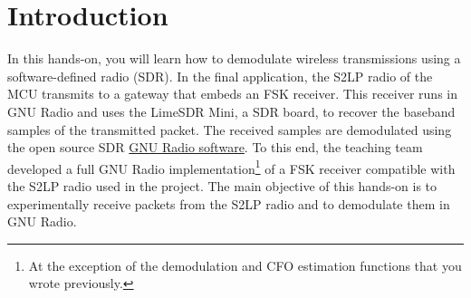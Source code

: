 \section*{Introduction}

In this hands-on, you will learn how to demodulate wireless transmissions using a software-defined radio (SDR).
In the final application, the S2LP radio of the MCU transmits to a gateway that embeds an FSK receiver.
This receiver runs in GNU Radio and uses the LimeSDR Mini, a SDR board, to recover the
baseband samples of the transmitted packet. The received samples are demodulated using the open source SDR \href{https://wiki.gnuradio.org/index.php/Main_Page}{GNU Radio software}.
To this end, the teaching team developed a full GNU Radio implementation\footnote{At the exception of the demodulation and CFO estimation functions that you wrote previously.}
of a FSK receiver compatible with the S2LP radio used in the project.
The main objective of this hands-on is to experimentally receive packets from the S2LP radio and to demodulate them in GNU Radio.

